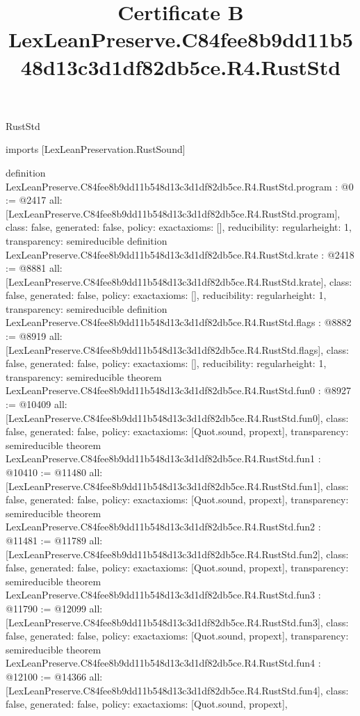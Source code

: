 \begin{lexlean}{RustStd}
\title{Certificate B LexLeanPreserve.C84fee8b9dd11b548d13c3d1df82db5ce.R4.RustStd}
\begin{coremodule}
imports [LexLeanPreservation.RustSound]

definition LexLeanPreserve.C84fee8b9dd11b548d13c3d1df82db5ce.R4.RustStd.program : @0 := @2417 {
  all: [LexLeanPreserve.C84fee8b9dd11b548d13c3d1df82db5ce.R4.RustStd.program],
  class: false,
  generated: false,
  policy: exact{axioms: []},
  reducibility: regular{height: 1},
  transparency: semireducible
}
definition LexLeanPreserve.C84fee8b9dd11b548d13c3d1df82db5ce.R4.RustStd.krate : @2418 := @8881 {
  all: [LexLeanPreserve.C84fee8b9dd11b548d13c3d1df82db5ce.R4.RustStd.krate],
  class: false,
  generated: false,
  policy: exact{axioms: []},
  reducibility: regular{height: 1},
  transparency: semireducible
}
definition LexLeanPreserve.C84fee8b9dd11b548d13c3d1df82db5ce.R4.RustStd.flags : @8882 := @8919 {
  all: [LexLeanPreserve.C84fee8b9dd11b548d13c3d1df82db5ce.R4.RustStd.flags],
  class: false,
  generated: false,
  policy: exact{axioms: []},
  reducibility: regular{height: 1},
  transparency: semireducible
}
theorem LexLeanPreserve.C84fee8b9dd11b548d13c3d1df82db5ce.R4.RustStd.fun0 : @8927 := @10409 {
  all: [LexLeanPreserve.C84fee8b9dd11b548d13c3d1df82db5ce.R4.RustStd.fun0],
  class: false,
  generated: false,
  policy: exact{axioms: [Quot.sound, propext]},
  transparency: semireducible
}
theorem LexLeanPreserve.C84fee8b9dd11b548d13c3d1df82db5ce.R4.RustStd.fun1 : @10410 := @11480 {
  all: [LexLeanPreserve.C84fee8b9dd11b548d13c3d1df82db5ce.R4.RustStd.fun1],
  class: false,
  generated: false,
  policy: exact{axioms: [Quot.sound, propext]},
  transparency: semireducible
}
theorem LexLeanPreserve.C84fee8b9dd11b548d13c3d1df82db5ce.R4.RustStd.fun2 : @11481 := @11789 {
  all: [LexLeanPreserve.C84fee8b9dd11b548d13c3d1df82db5ce.R4.RustStd.fun2],
  class: false,
  generated: false,
  policy: exact{axioms: [Quot.sound, propext]},
  transparency: semireducible
}
theorem LexLeanPreserve.C84fee8b9dd11b548d13c3d1df82db5ce.R4.RustStd.fun3 : @11790 := @12099 {
  all: [LexLeanPreserve.C84fee8b9dd11b548d13c3d1df82db5ce.R4.RustStd.fun3],
  class: false,
  generated: false,
  policy: exact{axioms: [Quot.sound, propext]},
  transparency: semireducible
}
theorem LexLeanPreserve.C84fee8b9dd11b548d13c3d1df82db5ce.R4.RustStd.fun4 : @12100 := @14366 {
  all: [LexLeanPreserve.C84fee8b9dd11b548d13c3d1df82db5ce.R4.RustStd.fun4],
  class: false,
  generated: false,
  policy: exact{axioms: [Quot.sound, propext]},
}
\end{coremodule}
\end{lexlean}

